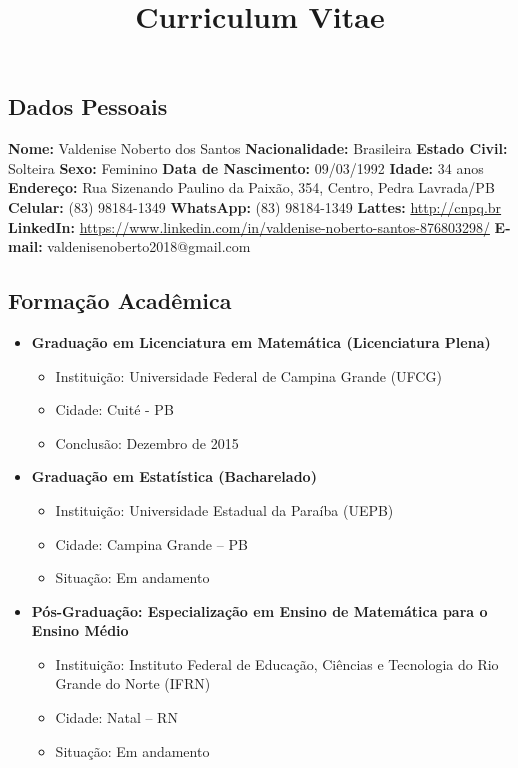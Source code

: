 \documentclass[
  letterpaper,
  DIV=11,
  numbers=noendperiod]{scrartcl}
\title{Curriculum Vitae}
\author{}
\date{}
\providecommand{\tightlist}{%
  \setlength{\itemsep}{0pt}\setlength{\parskip}{0pt}}
\begin{document}
\maketitle


\subsection{Dados Pessoais}\label{dados-pessoais}

\textbf{Nome:} Valdenise Noberto dos Santos \textbf{Nacionalidade:}
Brasileira \textbf{Estado Civil:} Solteira \textbf{Sexo:} Feminino
\textbf{Data de Nascimento:} 09/03/1992 \textbf{Idade:} 34 anos
\textbf{Endereço:} Rua Sizenando Paulino da Paixão, 354, Centro, Pedra
Lavrada/PB \textbf{Celular:} (83) 98184-1349 \textbf{WhatsApp:} (83)
98184-1349 \textbf{Lattes:} \url{http://cnpq.br} \textbf{LinkedIn:}
\url{https://www.linkedin.com/in/valdenise-noberto-santos-876803298/}
\textbf{E-mail:} valdenisenoberto2018@gmail.com

\subsection{Formação Acadêmica}\label{formauxe7uxe3o-acaduxeamica}

\begin{itemize}
\tightlist
\item
  \textbf{Graduação em Licenciatura em Matemática (Licenciatura Plena)}

  \begin{itemize}
  \tightlist
  \item
    Instituição: Universidade Federal de Campina Grande (UFCG)
  \item
    Cidade: Cuité - PB
  \item
    Conclusão: Dezembro de 2015
  \end{itemize}
\item
  \textbf{Graduação em Estatística (Bacharelado)}

  \begin{itemize}
  \tightlist
  \item
    Instituição: Universidade Estadual da Paraíba (UEPB)
  \item
    Cidade: Campina Grande -- PB
  \item
    Situação: Em andamento
  \end{itemize}
\item
  \textbf{Pós-Graduação: Especialização em Ensino de Matemática para o
  Ensino Médio}

  \begin{itemize}
  \tightlist
  \item
    Instituição: Instituto Federal de Educação, Ciências e Tecnologia do
    Rio Grande do Norte (IFRN)
  \item
    Cidade: Natal -- RN
  \item
    Situação: Em andamento
  \end{itemize}
\end{itemize}
\end{document}
